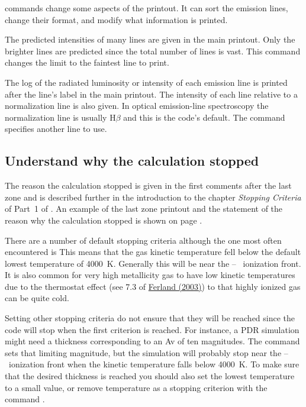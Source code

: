 \documentclass[12pt,twoside]{article}
\begin{document}
{ commands change some aspects
of the printout.  It can sort the
emission lines, change their format, and modify what information is printed.

  The
predicted intensities of many lines are given
in the main printout.  Only the brighter lines are predicted since the total
number of lines is vast.  This command changes the limit to the faintest
line to print.

 The log of the radiated
luminosity or intensity of each emission
line is printed after the line's label in the main printout.
The intensity
of each line relative to a normalization line is also given.
In optical
emission-line spectroscopy the normalization line is usually
$\mathrm{H}\beta$ and this is the code's default.
The  command specifies
another line to use.

\subsection{Understand why the calculation stopped}

The reason the calculation stopped is given in the first
comments after the last zone and is described further in the introduction
to the chapter \emph{Stopping Criteria} of Part~1 of \Hazy.
An example of the last
zone printout and the statement of the reason why the calculation stopped
is shown on page \pageref{sec:ZoneOutput}.

There are a number of default stopping criteria although the one most
often encountered is 
This means that the gas kinetic temperature fell below the default
lowest temperature of 4000~K.
Generally this will be near the \hplus -- \hO\ ionization front.
It is also common for very high metallicity gas to have low kinetic temperatures
due to the thermostat effect (see 7.3 of
\href{http://adsabs.harvard.edu/abs/2003ARA%26A..41..517F}{Ferland (2003)})
to that highly ionized gas can be quite cold.

Setting other stopping criteria do not ensure that they will be reached since
the code will stop when the first criterion is reached.  For instance, a PDR simulation
might need a thickness corresponding to an Av  of ten magnitudes.  
The command  sets that limiting magnitude,
but the simulation will probably stop near the \hplus -- \hO\ ionization front
when the kinetic temperature falls below 4000~K.  To make sure that the desired
thickness is reached you should also set the lowest temperature to a small value, or
remove temperature as a stopping criterion with the command
.

}
\end{document}
